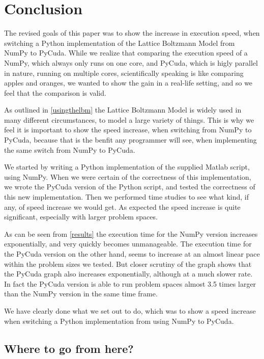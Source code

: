 \section{Conclusion}

The revised goals of this paper was to show the increase in execution speed, when switching a Python implementation of the Lattice Boltzmann Model from NumPy to PyCuda. While we realize that comparing the execution speed of a NumPy, which always only runs on one core, and PyCuda, which is higly parallel in nature, running on multiple cores, scientifically speaking is like comparing apples and oranges, we wanted to show the gain in a real-life setting, and so we feel that the comparison is valid.

As outlined in \autoref{usingthelbm} the Lattice Boltzmann Model is widely used in many different circumstances, to model a large variety of things. This is why we feel it is important to show the speed increase, when switching from NumPy to PyCuda, because that is the benfit any programmer will see, when implementing the same switch from NumPy to PyCuda.

We started by writing a Python implementation of the supplied Matlab script, using NumPy. When we were certain of the correctness of this implementation, we wrote the PyCuda version of the Python script, and tested the correctness of this new implementation. Then we performed time studies to see what kind, if any, of speed increase we would get. As expected the speed increase is quite significant, especially with larger problem spaces.

As can be seen from \autoref{results} the execution time for the NumPy version increases exponentially, and very quickly becomes unmanageable. The execution time for the PyCuda version on the other hand, seems to increase at an almost linear pace within the problem sizes we tested. But closer scrutiny of the graph shows that the PyCuda graph also increases exponentially, although at a much slower rate. In fact the PyCuda version is able to run problem spaces almost 3.5 times larger than the NumPy version in the same time frame.

We have clearly done what we set out to do, which was to show a speed increase when switching a Python implementation from using NumPy to PyCuda.

\subsection{Where to go from here?}

